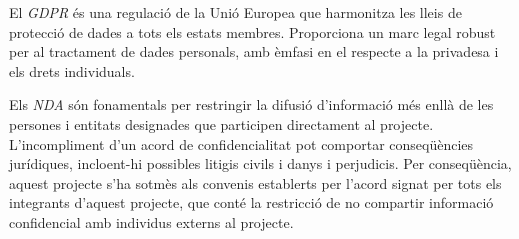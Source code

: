 El \textit{GDPR} és una regulació de la Unió Europea que harmonitza les lleis de protecció de dades a tots els estats membres. Proporciona un marc legal robust per al tractament de dades personals, amb èmfasi en el respecte a la privadesa i els drets individuals.

Els \textit{NDA} són fonamentals per restringir la difusió d'informació més enllà de les persones i entitats designades que participen directament al projecte. L'incompliment d'un acord de confidencialitat pot comportar conseqüències jurídiques, incloent-hi possibles litigis civils i danys i perjudicis. Per conseqüència, aquest projecte s'ha sotmès als convenis establerts per l'acord signat per tots els integrants d'aquest projecte, que conté la restricció de no compartir informació confidencial amb individus externs al projecte.

